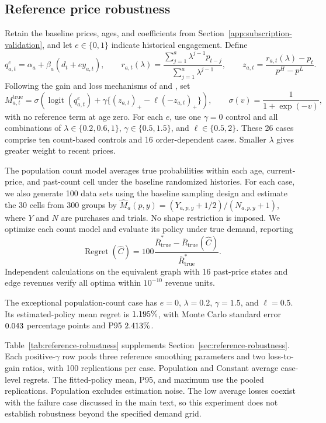 \subsection{Reference price robustness}
\label{app:numerical-reference}

\begingroup\color{black}
Retain the baseline prices, ages, and coefficients from Section~\ref{app:subscription-validation}, and let \(e\in\{0,1\}\) indicate historical engagement. Define
\[
 q_{a,t}^{e}=\alpha_a+\beta_a(d_t+e y_{a,t}),\qquad
 r_{a,t}(\lambda)=\frac{\sum_{j=1}^a\lambda^{j-1}p_{t-j}}{\sum_{j=1}^a\lambda^{j-1}},
 \qquad z_{a,t}=\frac{r_{a,t}(\lambda)-p_t}{p^H-p^L}.
\]
Following the gain and loss mechanisms of \citet{kopalle1996reference} and \citet{popescu2007}, set
\begin{equation}\label{eq:reference-robustness-dgp}
 M^{\mathrm{true}}_{a,t}
 =\sigma\!\left(\operatorname{logit}(q_{a,t}^{e})
       +\gamma\{(z_{a,t})_+-\ell(-z_{a,t})_+\}\right),
 \qquad \sigma(v)=\frac1{1+\exp(-v)},
\end{equation}
with no reference term at age zero. For each \(e\), use one \(\gamma=0\) control and all combinations of \(\lambda\in\{0.2,0.6,1\}\), \(\gamma\in\{0.5,1.5\}\), and \(\ell\in\{0.5,2\}\). These 26 cases comprise ten count-based controls and 16 order-dependent cases. Smaller \(\lambda\) gives greater weight to recent prices.

The population count model averages true probabilities within each age, current-price, and past-count cell under the baseline randomized histories. For each case, we also generate 100 data sets using the baseline sampling design and estimate the 30 cells from 300 groups by \(\widehat M_a(p,y)=(Y_{a,p,y}+1/2)/(N_{a,p,y}+1)\), where \(Y\) and \(N\) are purchases and trials. No shape restriction is imposed. We optimize each count model and evaluate its policy under true demand, reporting
\[
 \operatorname{Regret}(\widehat C)
 =100\frac{\bar R_{\mathrm{true}}^*-
               \bar R_{\mathrm{true}}(\widehat C)}{\bar R_{\mathrm{true}}^*}.
\]
Independent calculations on the equivalent graph with 16 past-price states and edge revenues verify all optima within \(10^{-10}\) revenue units.

The exceptional population-count case has \(e=0\), \(\lambda=0.2\), \(\gamma=1.5\), and \(\ell=0.5\). Its estimated-policy mean regret is \(1.195\%\), with Monte Carlo standard error \(0.043\) percentage points and P95 \(2.413\%\).
\par\endgroup
Table~\ref{tab:reference-robustness} supplements Section~\ref{sec:reference-robustness}. Each positive-\(\gamma\) row pools three reference smoothing parameters and two loss-to-gain ratios, with 100 replications per case. Population and Constant average case-level regrets. The fitted-policy mean, P95, and maximum use the pooled replications. Population excludes estimation noise. The low average losses coexist with the failure case discussed in the main text, so this experiment does not establish robustness beyond the specified demand grid.

